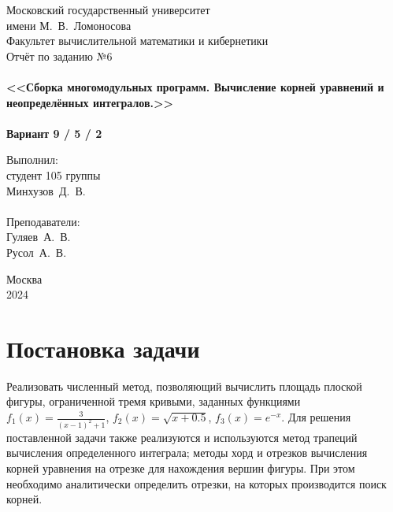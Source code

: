 \documentclass[a4paper,12pt,titlepage,finall]{article}
\begin{document}
\lstset{basicstyle=\ttfamily,breaklines=true, numbers=left}

\begin{titlepage}
    \begin{center}
    {\small \sc Московский государственный университет \\имени М.~В.~Ломоносова\\ Факультет вычислительной математики и кибернетики\\}
    \vfill
    {\large \sc Отчёт по заданию №6}\\~\\
    {\large \bf <<Сборка многомодульных программ. Вычисление корней уравнений и неопределённых интегралов.>>}\\~\\
    {\large \bf Вариант 9 / 5 / 2}
    \end{center}

    \begin{flushright}
    \vfill
    {Выполнил:\\студент 105 группы\\Минхузов~Д.~В.\\~\\
    Преподаватели:\\Гуляев~А.~В.\\Русол~А.~В.}
    \end{flushright}

    \begin{center}
    \vfill
    {\small Москва\\2024}
    \end{center}
\end{titlepage}

\tableofcontents
\newpage

\section{Постановка задачи}

Реализовать численный метод, позволяющий вычислить площадь плоской фигуры, ограниченной тремя кривыми, заданных функциями $f_1(x)=\frac{3}{(x-1)^2+1}$, $f_2(x)=\sqrt{x+0.5}$, $f_3(x)=e^{-x}$. Для решения поставленной задачи также реализуются и используются метод трапеций вычисления определенного интеграла; методы хорд и отрезков вычисления корней уравнения на отрезке для нахождения вершин фигуры. При этом необходимо аналитически определить отрезки, на которых производится поиск корней.\\
\end{document}
